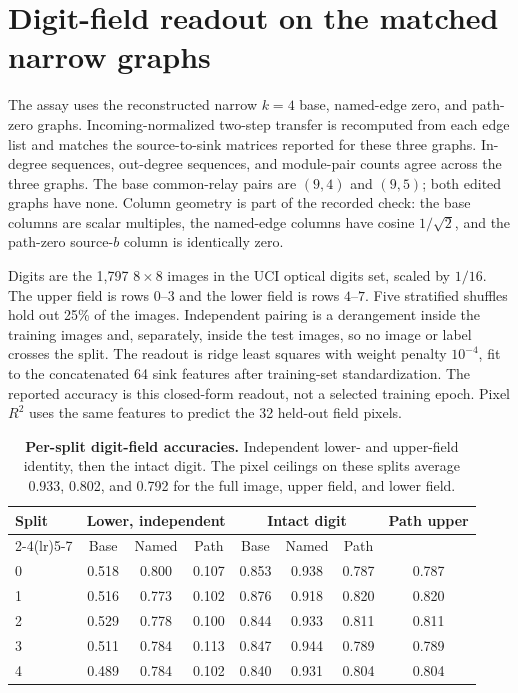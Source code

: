 \documentclass[10pt,letterpaper]{article}
\begin{document}
\section{Digit-field readout on the matched narrow graphs}
\label{sec:supp-fields}
The assay uses the reconstructed narrow $k{=}4$ base, named-edge zero, and
path-zero graphs. Incoming-normalized two-step transfer is recomputed from
each edge list and matches the source-to-sink matrices reported for these three graphs. In-degree
sequences, out-degree sequences, and module-pair counts agree across the
three graphs. The base common-relay pairs are $(9,4)$ and $(9,5)$; both
edited graphs have none. Column geometry is part of the recorded check:
the base columns are scalar multiples, the named-edge columns have cosine
$1/\sqrt{2}$, and the path-zero source-$b$ column is identically zero.

Digits are the 1,797 $8{\times}8$ images in the UCI optical digits
set, scaled by $1/16$. The upper field is rows $0$--$3$
and the lower field is rows $4$--$7$. Five stratified shuffles hold out 25\%
of the images. Independent pairing is a derangement inside the training
images and, separately, inside the test images, so no image or label crosses
the split. The readout is ridge least squares with weight penalty $10^{-4}$,
fit to the concatenated 64 sink features after training-set standardization.
The reported accuracy is this closed-form readout, not a selected training
epoch. Pixel $R^2$ uses the same features to predict the 32 held-out field
pixels.

\begin{table}[H]
\centering
\caption{\textbf{Per-split digit-field accuracies.} Independent lower- and
upper-field identity, then the intact digit. The pixel ceilings on these
splits average 0.933, 0.802, and 0.792 for the full image, upper field, and
lower field.}
\label{tab:field-splits}
\small
\begin{tabular}{@{}lccccccc@{}}
\toprule
Split & \multicolumn{3}{c}{Lower, independent} & \multicolumn{3}{c}{Intact digit} & Path upper \\
\cmidrule(lr){2-4}\cmidrule(lr){5-7}
 & Base & Named & Path & Base & Named & Path & \\
\midrule
0 & 0.518 & 0.800 & 0.107 & 0.853 & 0.938 & 0.787 & 0.787 \\
1 & 0.516 & 0.773 & 0.102 & 0.876 & 0.918 & 0.820 & 0.820 \\
2 & 0.529 & 0.778 & 0.100 & 0.844 & 0.933 & 0.811 & 0.811 \\
3 & 0.511 & 0.784 & 0.113 & 0.847 & 0.944 & 0.789 & 0.789 \\
4 & 0.489 & 0.784 & 0.102 & 0.840 & 0.931 & 0.804 & 0.804 \\
\bottomrule
\end{tabular}
\end{table}
\end{document}
